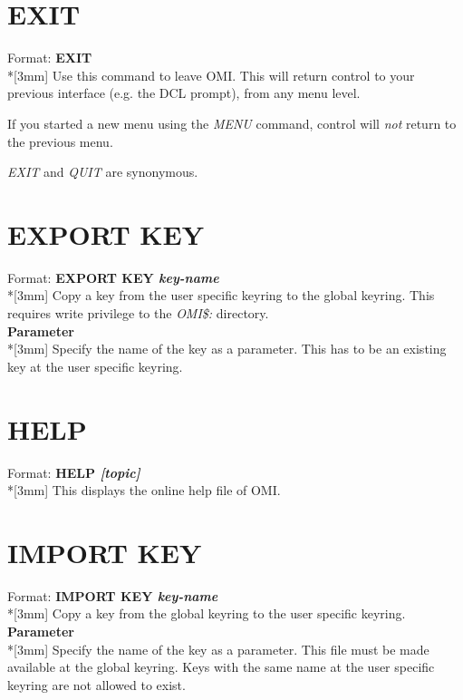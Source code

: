 \documentclass[a4paper]{book}
\newcommand{\vs}{\vspace{3mm}}
\renewcommand{\indent}{\hspace*{5mm}}
\begin{document}
\section{EXIT}
\label{subsec:mylabel14}

\indent Format: \textbf{EXIT}\dag\\*[3mm]
Use this command to leave OMI. This will return control to your previous 
interface (e.g. the DCL prompt), from any menu level.

If you started a new menu using the \textsl{MENU} command, control will \textit{not} return to 
the previous menu.

\vs

\textsl{EXIT} and \textsl{QUIT} are 
synonymous.

\section{EXPORT KEY}
\label{subsec:export}

\indent Format: \textbf{EXPORT KEY \textit{key-name}}\\*[3mm]
Copy a key from the user specific keyring to the global keyring. This 
requires write privilege to the \textsl{OMI{\$}:} directory.\\[3mm]
\textbf{Parameter}\\*[3mm]
Specify the name of the key as a parameter. This has to be an existing key 
at the user specific keyring.

\section{HELP}
\label{subsec:mylabel15}

\indent Format: \textbf{HELP \textit{[topic]}}\\*[3mm]
This displays the online help file of OMI.

\section{IMPORT KEY}
\label{subsec:import}

\indent Format: \textbf{IMPORT KEY \textit{key-name}}\\*[3mm]
Copy a key from the global keyring to the user specific keyring.\\[3mm]
\textbf{Parameter}\\*[3mm]
Specify the name of the key as a parameter. This file must be made available 
at the global keyring. Keys with the same name at the user specific keyring 
are not allowed to exist.
\end{document}
